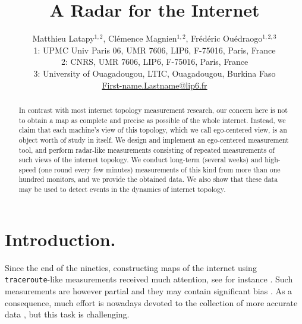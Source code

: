 \documentclass[times, 10pt,twocolumn]{article}
\newcommand{\traceroute}{{\tt trace\-route}}
\begin{document}
\title{A Radar for the Internet}
\author{
Matthieu Latapy$\mbox{}^{1,2}$, Cl\'emence Magnien$\mbox{}^{1,2}$, Fr\'ed\'eric Ou\'edraogo$\mbox{}^{1,2,3}$\\
1: UPMC Univ Paris 06, UMR 7606, LIP6, F-75016, Paris, France\\
2: CNRS, UMR 7606, LIP6, F-75016, Paris, France\\
3: University of Ouagadougou, LTIC, Ouagadougou, Burkina Faso\\
\url{First-name.Lastname@lip6.fr}}


\maketitle
\thispagestyle{empty}


\begin{abstract}

  In contrast with most internet topology measurement res\-earch, our
  concern here is not to obtain a map as complete and precise as
  possible of the whole internet. Instead, we claim that each
  machine's view of this topology, which we call ego-centered view, is
  an object worth of study in itself. We design and implement an
  ego-centered measurement tool, and perform radar-like measurements
  consisting of repeated measurements of such views of the internet topology. We
  conduct long-term (several weeks) and high-speed (one round every
  few minutes) measurements of this kind from more than one hundred
  monitors, and we provide the obtained data. We also show that these
  data may be used to detect events in the dynamics of internet
  topology.

\end{abstract}


\section{Introduction.}
\label{sec_introduction}

Since the end of the nineties,
constructing maps of the internet using \traceroute -like measurements
received much attention, see for instance
\cite{faloutsos99sigcomm, dimes,skitter,trahome,scamper,ripeNccTtm,nlanrAmp,whatToDo,atlas,heuristics,scriptroute}.
Such measurements are however partial and they may contain significant
bias
\cite{sampling,marginal,plrevisited,dallAsta,relevance,achlioptas05bias}.
As a consequence, much effort is nowadays devoted to the collection of
more accurate data \cite{dimes,trahome,e2emon2007,parisTraceroute}, but
this task is challenging.
\end{document}
